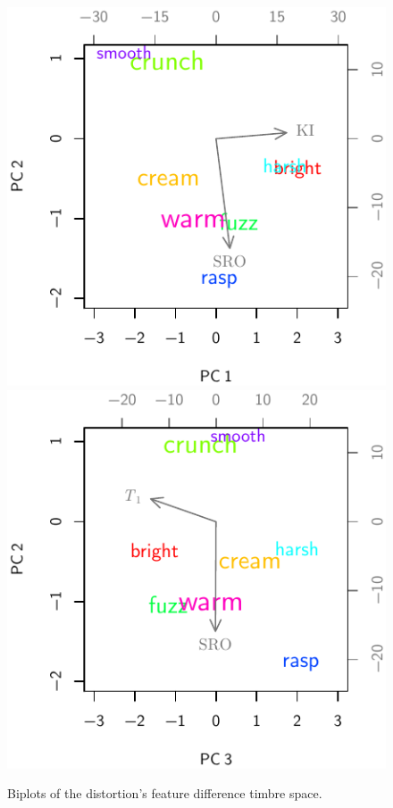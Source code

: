 			\begin{figure}[h!]
				\centering
				\subfloat
				{
					\includegraphics{chapter4/Images/DistortionDifferenceCentroidsPCA1-2.pdf}
					\label{fig:DistortionDifferenceCentroidsPCA1-2}
				}
				\quad
				\subfloat
				{
					\includegraphics{chapter4/Images/DistortionDifferenceCentroidsPCA3-2.pdf}
					\label{fig:DistortionDifferenceCentroidsPCA3-2}
				}
				\caption{Biplots of the distortion's feature difference timbre space.}
				\label{fig:DistortionDifferenceCentroidsPCAs}
			\end{figure}

